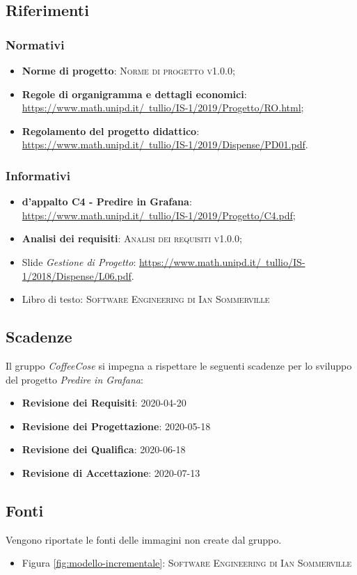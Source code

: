 \documentclass[../piano-di-progetto.tex]{subfiles}
\begin{document}
\subsection{Riferimenti}
\subsubsection{Normativi}
\begin{itemize}
  \item \textbf{Norme di progetto}: \textsc{Norme di progetto v1.0.0};
  \item \textbf{Regole di organigramma e dettagli economici}: \href{https://www.math.unipd.it/~tullio/IS-1/2019/Progetto/RO.html}{https://www.math.unipd.it/~tullio/IS-1/2019/Progetto/RO.html};
  \item \textbf{Regolamento del progetto didattico}: \href{https://www.math.unipd.it/~tullio/IS-1/2019/Dispense/PD01.pdf}{https://www.math.unipd.it/~tullio/IS-1/2019/Dispense/PD01.pdf}.
\end{itemize}

\subsubsection{Informativi}
\begin{itemize}
  \item \textbf{ d’appalto C4 - Predire in Grafana}: \href{https://www.math.unipd.it/~tullio/IS-1/2019/Progetto/C4.pdf}{https://www.math.unipd.it/~tullio/IS-1/2019/Progetto/C4.pdf};
  \item \textbf{Analisi dei requisiti}: \textsc{Analisi dei requisiti v1.0.0};
  \item Slide \emph{Gestione di Progetto}: \href{https://www.math.unipd.it/~tullio/IS-1/2018/Dispense/L06.pdf}{https://www.math.unipd.it/~tullio/IS-1/2018/Dispense/L06.pdf}.
  \item Libro di testo: \textsc{Software Engineering di Ian Sommerville}
\end{itemize}

\subsection{Scadenze}
\label{scadenze}
Il gruppo \emph{CoffeeCose} si impegna a rispettare le seguenti scadenze per lo sviluppo del progetto \emph{Predire in Grafana}:
\begin{itemize}
    \item \textbf{Revisione dei Requisiti}: 2020-04-20
    \item \textbf{Revisione dei Progettazione}: 2020-05-18
    \item \textbf{Revisione dei Qualifica}: 2020-06-18
    \item \textbf{Revisione di Accettazione}: 2020-07-13
\end{itemize}

\subsection{Fonti}
Vengono riportate le fonti delle immagini non create dal gruppo.
\begin{itemize}
    \item Figura \ref{fig:modello-incrementale}: \textsc{Software Engineering di Ian Sommerville}
\end{itemize}
\end{document}
